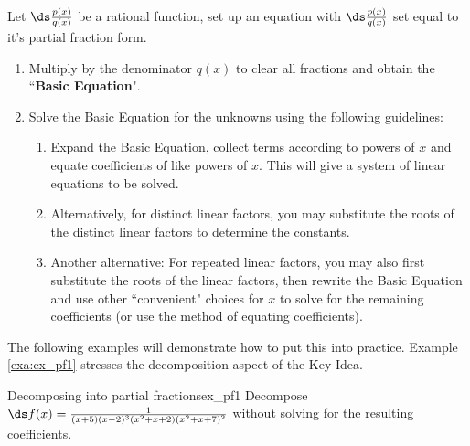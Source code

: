 \begin{formulabox} \label{idea:partial_fraction2}
Let $\ds \frac{p(x)}{q(x)}$ be a rational function, set up an equation with $\ds \frac{p(x)}{q(x)}$ set equal to it's partial fraction form.
\begin{enumerate}
	\item	Multiply by the denominator $ q(x) $ to clear all fractions and obtain the 	``\textbf{Basic Equation}".
	
	\item	Solve the Basic Equation for the unknowns using the following guidelines:
	
	\begin{enumerate}
	\item Expand the Basic Equation, collect terms according to powers of $ x $ and equate coefficients of like powers of $ x $. This will give a system of linear equations to be solved.
	\item	Alternatively, for distinct linear factors, you may substitute the roots of the distinct linear factors
	to determine the constants.
	\item Another alternative: For repeated linear factors, you may also first substitute the roots of the linear factors, then rewrite the Basic Equation and use other “convenient" choices for $ x $ to solve for the remaining
	coefficients (or use the method of equating coefficients).
	\end{enumerate}
\end{enumerate}	
\end{formulabox}



The following examples will demonstrate how to put this into practice. Example \ref{exa:ex_pf1} stresses the decomposition aspect of the Key Idea.\\

\begin{example}{Decomposing into partial fractions}{ex_pf1}
{
Decompose $\ds f(x)=\frac{1}{(x+5)(x-2)^3(x^2+x+2)(x^2+x+7)^2}$ without solving for the resulting coefficients.}
\end{example}


